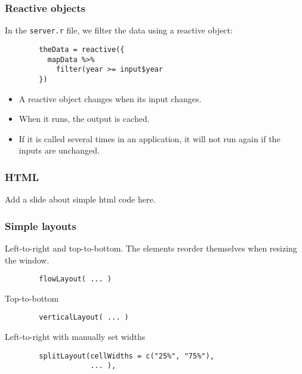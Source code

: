 \documentclass{beamer}
\begin{document}
	\begin{frame}[fragile]
		\frametitle{Reactive objects}

		In the \verb|server.r| file, we filter the data using a reactive object:

		\vspace{1em}
		
		\begin{exampleblock}{}
		\begin{lstlisting}
		theData = reactive({
		  mapData %>%
		    filter(year >= input$year
		})
		\end{lstlisting}
		\end{exampleblock}{}

		\vspace{1em}

		\begin{itemize}
			\item A reactive object changes when its input changes.
			\item When it runs, the output is cached.
			\item If it is called several times in an application, it will not run again if the inputs are unchanged.
		\end{itemize}

	\end{frame}

	\begin{frame}[fragile]
		\frametitle{HTML}
		Add a slide about simple html code here.
	\end{frame}

	\begin{frame}[fragile]
		\frametitle{Simple layouts}
		
		Left-to-right and top-to-bottom. The elements reorder themselves when resizing the window.
		\begin{exampleblock}{}
		\begin{BVerbatim}
		flowLayout( ... )
		\end{BVerbatim}
		\end{exampleblock}{}

		\vspace{1em}

		Top-to-bottom
		\begin{exampleblock}{}
		\begin{BVerbatim}
		verticalLayout( ... )
		\end{BVerbatim}
		\end{exampleblock}{}

		\vspace{1em}

		Left-to-right with manually set widths
		\begin{exampleblock}{}
		\begin{lstlisting}
		splitLayout(cellWidths = c("25%", "75%"),
		            ... ),
		\end{lstlisting}
		\end{exampleblock}{}

	\end{frame}
\end{document}
